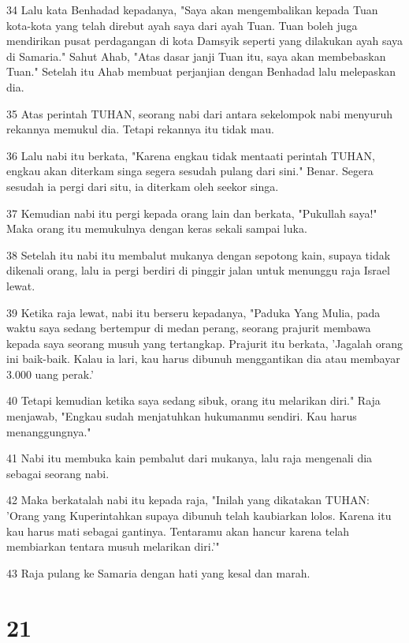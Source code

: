 \par 34 Lalu kata Benhadad kepadanya, "Saya akan mengembalikan kepada Tuan kota-kota yang telah direbut ayah saya dari ayah Tuan. Tuan boleh juga mendirikan pusat perdagangan di kota Damsyik seperti yang dilakukan ayah saya di Samaria." Sahut Ahab, "Atas dasar janji Tuan itu, saya akan membebaskan Tuan." Setelah itu Ahab membuat perjanjian dengan Benhadad lalu melepaskan dia.
\par 35 Atas perintah TUHAN, seorang nabi dari antara sekelompok nabi menyuruh rekannya memukul dia. Tetapi rekannya itu tidak mau.
\par 36 Lalu nabi itu berkata, "Karena engkau tidak mentaati perintah TUHAN, engkau akan diterkam singa segera sesudah pulang dari sini." Benar. Segera sesudah ia pergi dari situ, ia diterkam oleh seekor singa.
\par 37 Kemudian nabi itu pergi kepada orang lain dan berkata, "Pukullah saya!" Maka orang itu memukulnya dengan keras sekali sampai luka.
\par 38 Setelah itu nabi itu membalut mukanya dengan sepotong kain, supaya tidak dikenali orang, lalu ia pergi berdiri di pinggir jalan untuk menunggu raja Israel lewat.
\par 39 Ketika raja lewat, nabi itu berseru kepadanya, "Paduka Yang Mulia, pada waktu saya sedang bertempur di medan perang, seorang prajurit membawa kepada saya seorang musuh yang tertangkap. Prajurit itu berkata, 'Jagalah orang ini baik-baik. Kalau ia lari, kau harus dibunuh menggantikan dia atau membayar 3.000 uang perak.'
\par 40 Tetapi kemudian ketika saya sedang sibuk, orang itu melarikan diri." Raja menjawab, "Engkau sudah menjatuhkan hukumanmu sendiri. Kau harus menanggungnya."
\par 41 Nabi itu membuka kain pembalut dari mukanya, lalu raja mengenali dia sebagai seorang nabi.
\par 42 Maka berkatalah nabi itu kepada raja, "Inilah yang dikatakan TUHAN: 'Orang yang Kuperintahkan supaya dibunuh telah kaubiarkan lolos. Karena itu kau harus mati sebagai gantinya. Tentaramu akan hancur karena telah membiarkan tentara musuh melarikan diri.'"
\par 43 Raja pulang ke Samaria dengan hati yang kesal dan marah.

\chapter{21}

